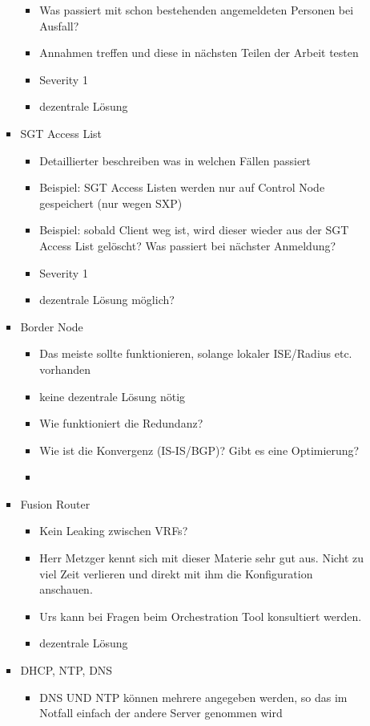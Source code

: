 \begin{itemize}
\begin{itemize}
\begin{itemize}
\begin{itemize}
				\item Was passiert mit schon bestehenden angemeldeten Personen bei Ausfall?
				\item Annahmen treffen und diese in nächsten Teilen der Arbeit testen
				\item Severity 1
				\item dezentrale Lösung
			\end{itemize}
			\item SGT Access List
			\begin{itemize}
				\item Detaillierter beschreiben was in welchen Fällen passiert
				\item Beispiel:  SGT Access Listen werden nur auf Control Node gespeichert (nur wegen SXP)
				\item Beispiel: sobald Client weg ist, wird dieser wieder aus der SGT Access List gelöscht? Was passiert bei nächster Anmeldung? 
				\item Severity 1
				\item dezentrale Lösung möglich?
			\end{itemize}
			\item Border Node
			\begin{itemize}
				\item Das meiste sollte funktionieren, solange lokaler ISE/Radius etc. vorhanden
				\item keine dezentrale Lösung nötig
				\item Wie funktioniert die Redundanz?
				\item Wie ist die Konvergenz (IS-IS/BGP)? Gibt es eine Optimierung?
				\item 
			\end{itemize}
			\item Fusion Router
			\begin{itemize}
				\item Kein Leaking zwischen VRFs?
				\item Herr Metzger kennt sich mit dieser Materie sehr gut aus. Nicht zu viel Zeit verlieren und direkt mit ihm die Konfiguration anschauen.
				\item Urs kann bei Fragen beim Orchestration Tool konsultiert werden.
				\item dezentrale Lösung
			\end{itemize}
			\item DHCP, NTP, DNS
			\begin{itemize}
				\item DNS UND NTP können mehrere angegeben werden, so das im Notfall einfach der andere Server genommen wird

\end{itemize}
\end{itemize}
\end{itemize}
\end{itemize}

